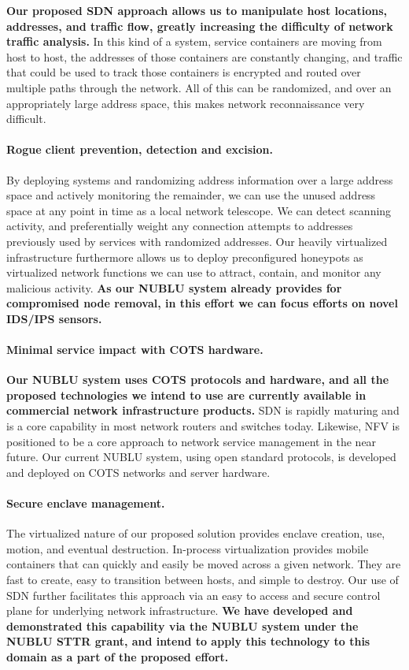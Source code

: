 \documentclass{sbir}
\begin{document}
{\bf Our proposed SDN approach allows us to manipulate host locations, addresses, and traffic flow, greatly increasing the difficulty of network traffic analysis.} In this kind of a system, service containers are moving from host to host, the addresses of those containers are constantly changing, and traffic that could be used to track those containers is encrypted and routed over multiple paths through the network. All of this can be randomized, and over an appropriately large address space, this makes network reconnaissance very difficult.

\paragraph{Rogue client prevention, detection and excision.}
By deploying systems and randomizing address information over a large address space and actively monitoring the remainder, we can use the unused address space at any point in time as a local network telescope. We can detect scanning activity, and preferentially weight any connection attempts to addresses previously used by services with randomized addresses. Our heavily virtualized infrastructure furthermore allows us to deploy preconfigured honeypots as virtualized network functions we can use to attract, contain, and monitor any malicious activity. {\bf As our NUBLU system already provides for compromised node removal, in this effort we can focus efforts on novel IDS/IPS sensors.}

\paragraph{Minimal service impact with COTS hardware.}
{\bf Our NUBLU system uses COTS protocols and hardware, and all the proposed technologies we intend to use are currently available in commercial network infrastructure products.} SDN is rapidly maturing and is a core capability in most network routers and switches today.  Likewise, NFV is positioned to be a core approach to network service management in the near future. Our current NUBLU system, using open standard protocols, is developed and deployed on COTS networks and server hardware.

\paragraph{Secure enclave management.}
The virtualized nature of our proposed solution provides enclave creation, use, motion, and eventual destruction.  In-process virtualization provides mobile containers that can quickly and easily be moved across a given network.  They are fast to create, easy to transition between hosts, and simple to destroy.  Our use of SDN further facilitates this approach via an easy to access and secure control plane for underlying network infrastructure.  {\bf We have developed and demonstrated this capability via the NUBLU system under the NUBLU STTR grant, and intend to apply this technology to this domain as a part of the proposed effort.}
\end{document}
